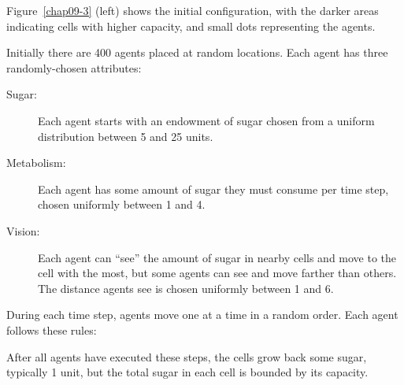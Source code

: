 \documentclass[12pt]{book}
\theoremstyle{exercise}
\newcommand{\py}{\verb}%}
\begin{document}
Figure~\ref{chap09-3} (left) shows the initial configuration, with the darker
areas indicating cells with higher capacity, and small dots
representing the agents.


Initially there are 400 agents placed at random locations.  Each
agent has three randomly-chosen attributes:

\begin{description}

\item[Sugar:] Each agent starts with an endowment of sugar chosen
from a uniform distribution between 5 and 25 units.

\item[Metabolism:] Each agent has some amount of sugar they must
consume per time step, chosen uniformly between 1 and 4.

\item[Vision:] Each agent can ``see'' the amount
of sugar in nearby cells and move to the cell with the most, but
some agents can see and move farther than others.  The distance agents
see is chosen uniformly between 1 and 6.

\end{description}

During each time step, agents move one at a time in a random order.
Each agent follows these rules:


After all agents have executed these steps, the cells grow back
some sugar, typically 1 unit, but the total sugar in each cell is
bounded by its capacity.
\end{document}
